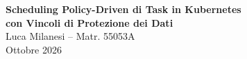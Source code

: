 \documentclass[11pt,a4paper]{article}
\begin{document}
\begin{center}
{\Large\bfseries Scheduling Policy-Driven di Task in Kubernetes\\con Vincoli di Protezione dei Dati}\\[0.5em]
{\large Luca Milanesi -- Matr. 55053A}\\[0.25em]
{\large Ottobre 2026}
\end{center}

\noindent

\end{document}
